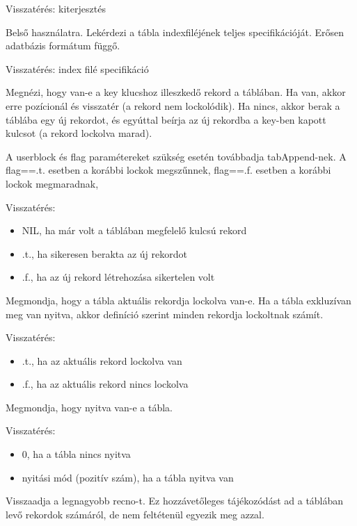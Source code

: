 Visszatérés: kiterjesztés

 
Belső használatra. 
Lekérdezi a tábla indexfiléjének teljes specifikációját.
Erősen adatbázis formátum függő.

Visszatérés: index filé specifikáció



Megnézi, hogy van-e a key klucshoz illeszkedő rekord a táblában.
Ha van, akkor erre pozícionál és visszatér (a rekord nem lockolódik).
Ha nincs, akkor berak a táblába egy új rekordot, és egyúttal 
beírja az új rekordba a key-ben kapott kulcsot (a rekord lockolva marad). 

A userblock és flag paramétereket szükség esetén továbbadja tabAppend-nek.
A flag==.t. esetben a korábbi lockok megszűnnek, 
  flag==.f. esetben a korábbi lockok megmaradnak, 

Visszatérés:
\begin{itemize}
\item NIL, ha már volt a táblában megfelelő kulcsú rekord
\item .t., ha sikeresen berakta az új rekordot
\item .f., ha az új rekord létrehozása sikertelen volt
\end{itemize}
 




Megmondja, hogy a tábla aktuális rekordja lockolva van-e.
Ha a tábla exkluzívan meg van nyitva, akkor definíció
szerint  minden rekordja lockoltnak számít.

Visszatérés:
\begin{itemize}
\item .t., ha az aktuális rekord lockolva van
\item .f., ha az aktuális rekord nincs lockolva 
\end{itemize}
 
Megmondja, hogy nyitva van-e a tábla.

Visszatérés:
\begin{itemize}
\item 0, ha a tábla nincs nyitva
\item nyitási mód (pozitív szám), ha a tábla nyitva van
\end{itemize}
 

Visszaadja a legnagyobb recno-t. Ez hozzávetőleges
tájékozódást ad a táblában levő rekordok számáról, de nem
feltétenül egyezik meg azzal.

